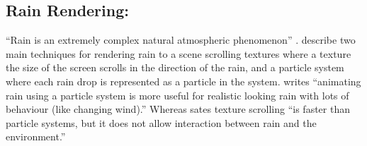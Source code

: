 \subsection{Rain Rendering:}
“Rain is an extremely complex natural atmospheric phenomenon” \citep*{APuig-Centelles09}.
\citet*{APuig-Centelles09} describe two main techniques for rendering rain to a scene scrolling textures where a texture the size of the screen scrolls in the direction of the rain, and a particle system where each rain drop is represented as a particle in the system.
\citet{STariq07} writes “animating rain using a particle system is more useful for realistic looking rain with lots of behaviour (like changing wind).”
Whereas \citet*{APuig-Centelles09} sates texture scrolling “is faster than particle systems, but it does not allow interaction between rain and the environment.”